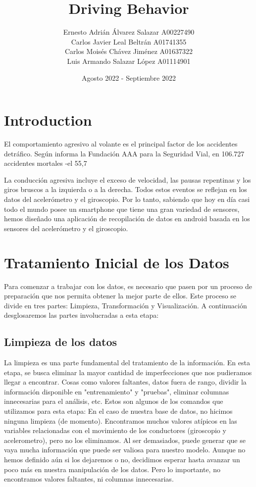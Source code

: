 \documentclass{article}
\title{Driving Behavior}
\author{
Ernesto Adrián Álvarez Salazar  A00227490\\
Carlos Javier Leal Beltrán  A01741355\\
Carlos Moisés Chávez Jiménez  A01637322\\
Luis Armando Salazar López  A01114901\\
}
\date{Agosto 2022 - Septiembre 2022}
\begin{document}
\maketitle

\section{Introduction}
El comportamiento agresivo al volante es el principal factor de los accidentes detráfico. Según informa la Fundación AAA para la Seguridad Vial, en 106.727 accidentes mortales -el 55,7%

La conducción agresiva incluye el exceso de velocidad, las pausas repentinas y los giros bruscos a la izquierda o a la derecha. Todos estos eventos se reflejan en los datos del acelerómetro y el giroscopio. Por lo tanto, sabiendo que hoy en día casi todo el mundo posee un smartphone que tiene una gran variedad de sensores, hemos diseñado una aplicación de recopilación de datos en android basada en los sensores del acelerómetro y el giroscopio.


\section{Tratamiento Inicial de los Datos}

Para comenzar a trabajar con los datos, es necesario que pasen por un proceso de preparación que nos permita obtener la mejor parte de ellos. Este proceso se divide en tres partes: Limpieza, Transformación y Visualización. A continuación desglosaremos las partes involucradas a esta etapa:

    \subsection{Limpieza de los datos}

        La limpieza es una parte fundamental del tratamiento de la información. En esta etapa, se busca eliminar la mayor cantidad de imperfecciones que nos pudieramos llegar a encontrar. Cosas como valores faltantes, datos fuera de rango, dividir la información disponible en "entrenamiento" y "pruebas", eliminar columnas innecesarias para el análisis, etc. Estos son algunos de los comandos que utilizamos para esta etapa:
        En el caso de nuestra base de datos, no hicimos ninguna limpieza (de momento). Encontramos muchos valores atípicos en las variables relacionadas con el movimiento de los conductores (giroscopio y acelerometro), pero no los eliminamos. Al ser demasiados, puede generar que se vaya mucha información que puede ser valiosa para nuestro modelo. Aunque no hemos definido aún si los dejaremos o no, decidimos esperar hasta avanzar un poco más en nuestra manipulación de los datos. Pero lo importante, no encontramos valores faltantes, ni columnas innecesarias. \\
\end{document}
